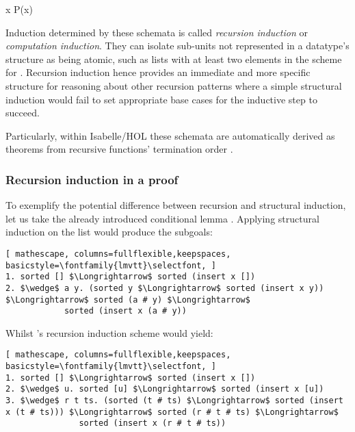   {\forall x \;\; P\;(x)}

\vspace{2 mm}


Induction determined by these schemata is called \emph{recursion induction} or \emph{computation induction}.
%
They can isolate sub-units not represented in a datatype's structure as being atomic, such as lists with at least two elements in the scheme for .
%
Recursion induction hence provides an immediate and more specific structure for reasoning about other recursion patterns where a simple structural induction would fail to set appropriate base cases for the inductive step to succeed.

Particularly, within Isabelle/HOL these schemata are automatically derived as theorems from recursive functions' termination order \cite{krauss-term}.

\subsubsection*{Recursion induction in a proof}


To exemplify the potential difference between recursion and structural induction, let us take the already introduced conditional lemma .
%
Applying structural induction on the list  would produce the subgoals:

\begin{lstlisting}[ mathescape, columns=fullflexible,keepspaces, basicstyle=\fontfamily{lmvtt}\selectfont, ]
1. sorted [] $\Longrightarrow$ sorted (insert x [])
2. $\wedge$ a y. (sorted y $\Longrightarrow$ sorted (insert x y)) $\Longrightarrow$ sorted (a # y) $\Longrightarrow$
            sorted (insert x (a # y))
\end{lstlisting}

\noindent Whilst 's recursion induction scheme would yield:

\begin{lstlisting}[ mathescape, columns=fullflexible,keepspaces, basicstyle=\fontfamily{lmvtt}\selectfont, ]
1. sorted [] $\Longrightarrow$ sorted (insert x [])
2. $\wedge$ u. sorted [u] $\Longrightarrow$ sorted (insert x [u])
3. $\wedge$ r t ts. (sorted (t # ts) $\Longrightarrow$ sorted (insert x (t # ts))) $\Longrightarrow$ sorted (r # t # ts) $\Longrightarrow$
               sorted (insert x (r # t # ts))
\end{lstlisting}

